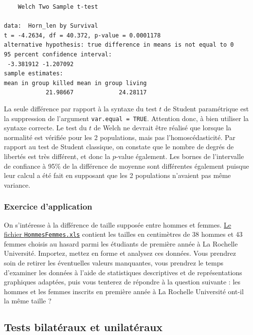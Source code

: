 \documentclass[
  a4paper,
]{article}
\begin{document}
\begin{verbatim}
    Welch Two Sample t-test

data:  Horn_len by Survival
t = -4.2634, df = 40.372, p-value = 0.0001178
alternative hypothesis: true difference in means is not equal to 0
95 percent confidence interval:
 -3.381912 -1.207092
sample estimates:
mean in group killed mean in group living 
            21.98667             24.28117 
\end{verbatim}

La seule différence par rapport à la syntaxe du test \(t\) de Student paramétrique est la suppression de l'argument \texttt{var.equal\ =\ TRUE}. Attention donc, à bien utiliser la syntaxe correcte. Le test du \(t\) de Welch ne devrait être réalisé que lorsque la normalité est vérifiée pour les 2 populations, mais pas l'homoscédasticité. Par rapport au test de Student classique, on constate que le nombre de degrés de libertés est très différent, et donc la \(p\)-value également. Les bornes de l'intervalle de confiance à 95\% de la différence de moyenne sont différentes également puisque leur calcul a été fait en supposant que les 2 populations n'avaient pas même variance.

\hypertarget{exercice-dapplication-2}{%
\subsubsection{Exercice d'application}\label{exercice-dapplication-2}}

On s'intéresse à la différence de taille supposée entre hommes et femmes. \href{https://besibo.github.io/Biometrie3/data/HommesFemmes.xls}{Le fichier \texttt{HommesFemmes.xls}} contient les tailles en centimètres de 38 hommes et 43 femmes choisis au hasard parmi les étudiants de première année à La Rochelle Université. Importez, mettez en forme et analysez ces données. Vous prendrez soin de retirer les éventuelles valeurs manquantes, vous prendrez le temps d'examiner les données à l'aide de statistiques descriptives et de représentations graphiques adaptées, puis vous tenterez de répondre à la question suivante : les hommes et les femmes inscrits en première année à La Rochelle Université ont-il la même taille ?

\hypertarget{tests-bilatuxe9raux-et-unilatuxe9raux}{%
\subsection{Tests bilatéraux et unilatéraux}\label{tests-bilatuxe9raux-et-unilatuxe9raux}}
\end{document}
